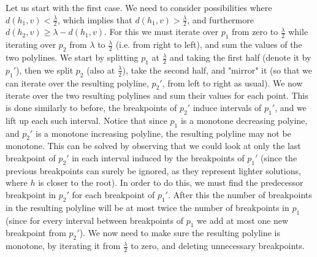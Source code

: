 \documentclass[11pt,a4paper]{article}
\theoremstyle{definition}
\theoremstyle{remark}
\begin{document}
\begin{enumerate}
Let us start with the first case. We need to consider possibilities where $d(h_1,v) < \frac{\lambda}{2}$, which implies that $d(h_1,v) > \frac{\lambda}{2}$, and furthermore $d(h_2,v) \geq \lambda - d(h_1,v)$. For this we must iterate over $p_1$ from zero to $\frac{\lambda}{2}$ while iterating over $p_2$ from $\lambda$ to $\frac{\lambda}{2}$ (i.e. from right to left), and sum the values of the two polylines. We start by splitting $p_1$ at $\frac{\lambda}{2}$ and taking the first half (denote it by $p_1'$), then we split $p_2$ (also at $\frac{\lambda}{2}$), take the second half, and "mirror" it (so that we can iterate over the resulting polyline, $p_2'$, from left to right as usual). We now iterate over the two resulting polylines and sum their values for each point. This is done similarly to before, the breakpoints of $p_2'$ induce intervals of $p_1'$, and we lift up each such interval. Notice that since $p_1$ is a monotone decreasing polyine, and $p_2'$ is a monotone increasing polyline, the resulting polyline may not be monotone. This can be solved by observing that we could look at only the last breakpoint of $p_2'$ in each interval induced by the breakpoints of $p_1'$ (since the previous breakpoints can surely be ignored, as they represent lighter solutions, where $h$ is closer to the root). In order to do this, we must find the predecessor breakpoint in $p_2'$ for each breakpoint of $p_1'$. After this the number of breakpoints in the resulting polyline will be at most twice the number of breakpoints in $p_1$ (since for every interval between breakpoints of $p_1$ we add at most one new breakpoint from $p_2'$). We now need to make sure the resulting polyline is monotone, by iterating it from $\frac{\lambda}{2}$ to zero, and deleting unnecessary breakpoints.


\end{enumerate}
\end{document}
